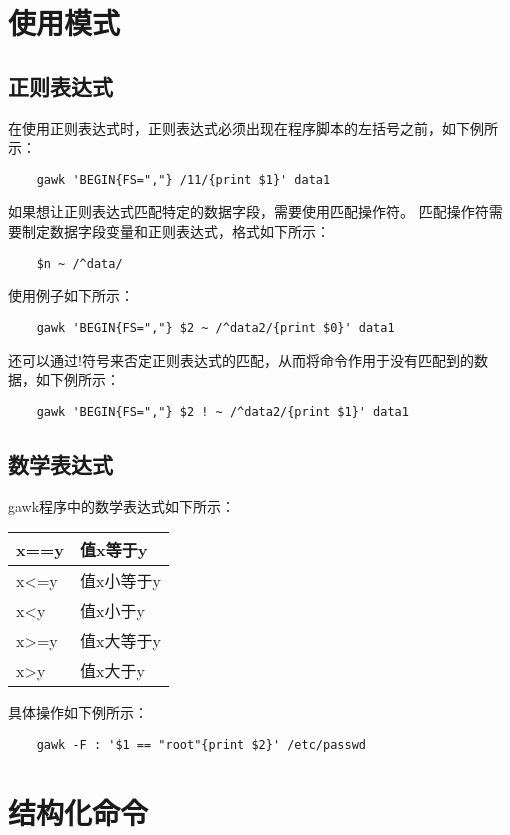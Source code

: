 \documentclass[a4paper,left=2.5cm,right=2.5cm,11pt]{article}
\begin{document}
\section{使用模式}
\subsection{正则表达式}
	在使用正则表达式时，正则表达式必须出现在程序脚本的左括号之前，如下例所示：
	\begin{lstlisting}
	gawk 'BEGIN{FS=","} /11/{print $1}' data1
	\end{lstlisting}

	如果想让正则表达式匹配特定的数据字段，需要使用匹配操作符。
	匹配操作符需要制定数据字段变量和正则表达式，格式如下所示：
	\begin{lstlisting}
	$n ~ /^data/
	\end{lstlisting}

	使用例子如下所示：
	\begin{lstlisting}
	gawk 'BEGIN{FS=","} $2 ~ /^data2/{print $0}' data1
	\end{lstlisting}

	还可以通过!符号来否定正则表达式的匹配，从而将命令作用于没有匹配到的数据，如下例所示：
	\begin{lstlisting}
	gawk 'BEGIN{FS=","} $2 ! ~ /^data2/{print $1}' data1
	\end{lstlisting}

\subsection{数学表达式}
	gawk程序中的数学表达式如下所示：
	\begin{longtable}{p{2cm}p{5cm}}
	\hline
	x==y & 值x等于y \\
	\hline
	x<=y & 值x小等于y \\
	\hline
	x<y & 值x小于y \\
	\hline
	x>=y & 值x大等于y \\
	\hline
	x>y & 值x大于y \\
	\hline
	\end{longtable}

	具体操作如下例所示：
	\begin{lstlisting}
	gawk -F : '$1 == "root"{print $2}' /etc/passwd
	\end{lstlisting}

\section{结构化命令}
\end{document}
